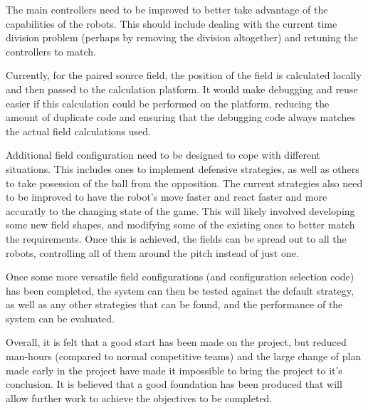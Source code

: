 \documentclass[10pt]{article}
\begin{document}
The main controllers need to be improved to better take advantage of the
capabilities of the robots.  This should include dealing with the current time
division problem (perhaps by removing the division altogether) and retuning the
controllers to match.

Currently, for the paired source field, the position of the field is calculated
locally and then passed to the calculation platform.  It would make debugging
and reuse easier if this calculation could be performed on the platform,
reducing the amount of duplicate code and ensuring that the debugging code
always matches the actual field calculations used.

Additional field configuration need to be designed to cope with different
situations.  This includes ones to implement defensive strategies, as well as
others to take posession of the ball from the opposition.  The current
strategies also need to be improved to have the robot's move faster and react
faster and more accuratly to the changing state of the game.  This will likely
involved developing some new field shapes, and modifying some of the existing
ones to better match the requirements. Once this is achieved, the fields can be
spread out to all the robots, controlling all of them around the pitch instead
of just one.

Once some more versatile field configurations (and configuration selection code)
has been completed, the system can then be tested against the default strategy,
as well as any other strategies that can be found, and the performance of the
system can be evaluated.

Overall, it is felt that a good start has been made on the project, but reduced
man-hours (compared to normal competitive teams) and the large change of plan
made early in the project have made it impossible to bring the project to it's
conclusion.  It is believed that a good foundation has been produced that will
allow further work to achieve the objectives to be completed.

\cleardoublepage{}

\end{document}
